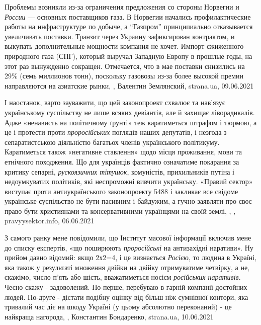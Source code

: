 Проблемы возникли из-за ограничения предложения со стороны Норвегии и \emph{России} —
основных поставщиков газа. В Норвегии начались профилактические работы на
инфраструктуре по добыче, а \enquote{Газпром} принципиально отказывается
увеличивать поставки. Транзит через Украину зафиксирован контрактом, и выкупать
дополнительные мощности компания не хочет.  Импорт сжиженного природного газа
(СПГ), который выручал Западную Европу в прошлые годы, на этот раз вынужденно
сокращен. Отмечается, что в мае поставки снизились на 29\% (семь миллионов
тонн), поскольку газовозы из-за более высокой премии направляются на азиатские
рынки,
, Валентин Землянский, strana.ua, 09.06.2021

І наостанок, варто зауважити, що цей законопроект схвалює та нав'язує
українському суспільству не лише всяких девіантів, але й захищає ліворадикалів.
Адже «ненависть на політичному ґрунті» теж каратиметься штрафом і тюрмою, а це
і протести проти \emph{проросійських} поглядів наших депутатів, і незгода з
сепаратистською діяльністю багатьох членів українського політикуму.
Каратиметься також «негативне ставлення» щодо місця проживання, мови та
етнічного походження. Що для українців фактично означатиме покарання за критику
сепарні, \emph{рускоязичних тітушок}, комуністів, прихильників путіна і
недоумкуватих політиків, які неспроможні вивчити українську.  «Правий сектор»
виступає проти антиукраїнського законопроекту 5488 і закликає все свідоме
українське суспільство не бути пасивним і байдужим, а гучно заявляти про своє
право бути християнами та консервативними українцями на своїй землі,
, , pravyysektor.info, 06.06.2021

З самого ранку мене повідомили, що Інститут масової інформації включив мене до
списку експертів, «що поширюють \emph{проросійські} на антизахідні наративи». Ну
прийом давно відомий: якщо 2х2=4, і це визнається \emph{Росією}, то людина в
Україні, яка також у результаті множення двійки на двійку отримуватиме
четвірку, а не, скажімо, число п'ять або шість, вважатиметься носієм
\emph{російських наративів}. Чесно скажу - задоволений. По-перше, перебуваю в
гарній компанії достойних людей.  По-друге - дістати подібну оцінку від більш
ніж сумнівної контори, яка тривалий час діє на шкоду Україні (у цьому абсолютно
переконаний) - це найкраща нагорода,
, 
Константин Бондаренко, strana.ua, 10.06.2021

